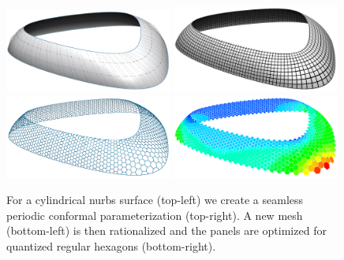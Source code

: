 \documentclass[twoside]{article}
\newcommand{\nurbs}{{\sc nurbs}\xspace}
\def\mainbibliography {
	
}
\begin{document}
\begin{figure}[b]
  \centering
  \includegraphics[width=0.49\textwidth]{images/teaser1_grid.png}
  \includegraphics[width=0.49\textwidth]{images/teaser2_2.png}
  \includegraphics[width=0.49\textwidth]{images/teaser4_1.png}
  \includegraphics[width=0.49\textwidth]{images/teaser3.png}
  \caption{For a cylindrical \nurbs surface (top-left) we create a
    seamless periodic conformal parameterization (top-right). A new
    mesh (bottom-left) is then rationalized and the panels are
    optimized for quantized regular hexagons (bottom-right).}
  \label{fig:teaser}
\end{figure}










\mainbibliography
\end{document}
